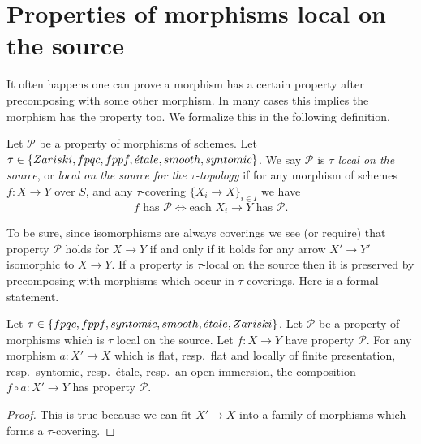 \section{Properties of morphisms local on the source}
\label{section-properties-morphisms-local-source}

\noindent
It often happens one can prove a morphism has a certain property
after precomposing with some other morphism. In many cases this
implies the morphism has the property too. We formalize
this in the following definition.

\begin{definition}
\label{definition-property-morphisms-local-source}
Let $\mathcal{P}$ be a property of morphisms of schemes.
Let $\tau \in \{Zariski, \linebreak[0] fpqc, \linebreak[0] fppf, \linebreak[0]
\etale, \linebreak[0] smooth, \linebreak[0] syntomic\}$.
We say $\mathcal{P}$ is
{\it $\tau$ local on the source}, or
{\it local on the source for the $\tau$-topology} if for
any morphism of schemes $f : X \to Y$ over $S$, and any
$\tau$-covering $\{X_i \to X\}_{i \in I}$ we
have
$$
f \text{ has }\mathcal{P}
\Leftrightarrow
\text{each }X_i \to Y\text{ has }\mathcal{P}.
$$
\end{definition}

\noindent
To be sure, since isomorphisms are always coverings
we see (or require) that property $\mathcal{P}$ holds for $X \to Y$
if and only if it holds for any arrow $X' \to Y'$ isomorphic to $X \to Y$.
If a property is $\tau$-local on the source then it is preserved by
precomposing with morphisms which occur in $\tau$-coverings. Here
is a formal statement.

\begin{lemma}
\label{lemma-precompose-property-local-source}
Let $\tau \in \{fpqc, fppf, syntomic, smooth, {\acute{e}tale}, Zariski\}$.
Let $\mathcal{P}$ be a property of morphisms which is $\tau$ local
on the source. Let $f : X \to Y$ have property $\mathcal{P}$.
For any morphism $a : X' \to X$ which is
flat, resp.\ flat and locally of finite presentation, resp.\ syntomic,
resp.\ \'etale, resp.\ an open immersion, the composition
$f \circ a : X' \to Y$ has property $\mathcal{P}$.
\end{lemma}

\begin{proof}
This is true because we can fit $X' \to X$ into a family of
morphisms which forms a $\tau$-covering.
\end{proof}

